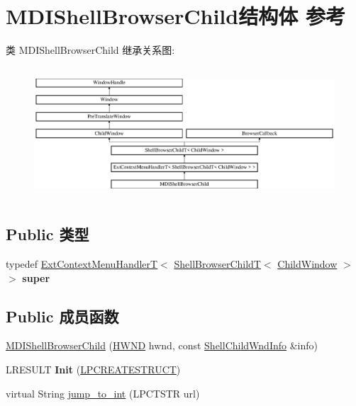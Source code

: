 \hypertarget{struct_m_d_i_shell_browser_child}{}\section{M\+D\+I\+Shell\+Browser\+Child结构体 参考}
\label{struct_m_d_i_shell_browser_child}
类 M\+D\+I\+Shell\+Browser\+Child 继承关系图\+:\begin{figure}[H]
\begin{center}
\leavevmode
\includegraphics[height=4.962025cm]{struct_m_d_i_shell_browser_child}
\end{center}
\end{figure}
\subsection*{Public 类型}
\begin{DoxyCompactItemize}
\item 
\mbox{\label{struct_m_d_i_shell_browser_child_a4f55f14f28836c77a96169e56cf40d05}} 
typedef \hyperlink{struct_ext_context_menu_handler_t}{Ext\+Context\+Menu\+HandlerT}$<$ \hyperlink{struct_shell_browser_child_t}{Shell\+Browser\+ChildT}$<$ \hyperlink{struct_child_window}{Child\+Window} $>$ $>$ {\bfseries super}
\end{DoxyCompactItemize}
\subsection*{Public 成员函数}
\begin{DoxyCompactItemize}
\item 
\hyperlink{struct_m_d_i_shell_browser_child_a807757636a4879dbb770868ba669d434}{M\+D\+I\+Shell\+Browser\+Child} (\hyperlink{interfacevoid}{H\+W\+ND} hwnd, const \hyperlink{struct_shell_child_wnd_info}{Shell\+Child\+Wnd\+Info} \&info)
\item 
\mbox{\label{struct_m_d_i_shell_browser_child_add64ed035556cbe3d84a8d2d6c685e04}} 
L\+R\+E\+S\+U\+LT {\bfseries Init} (\hyperlink{structtag_c_r_e_a_t_e_s_t_r_u_c_t_a}{L\+P\+C\+R\+E\+A\+T\+E\+S\+T\+R\+U\+CT})
\item 
virtual String \hyperlink{struct_m_d_i_shell_browser_child_af95b24955890eb76e84227629c886329}{jump\+\_\+to\+\_\+int} (L\+P\+C\+T\+S\+TR url)
\end{DoxyCompactItemize}
